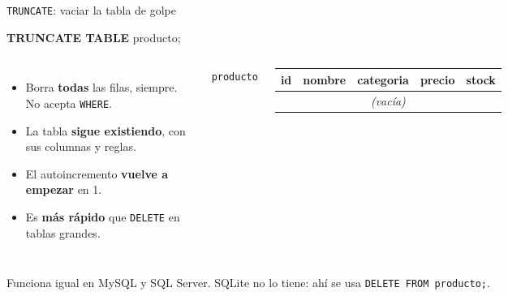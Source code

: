 \documentclass[aspectratio=169,10pt,c]{beamer}
\newcommand{\tbl}[1]{\textcolor{utpNaranja}{\texttt{#1}}}
\newcommand{\kw}[1]{\textcolor{utpRojo}{\textbf{#1}}}
\newenvironment{sqlcode}[1][.86\textwidth]
  {\begin{center}\begin{lrbox}{\sqlbuf}\begin{minipage}{#1}\ttfamily\footnotesize\vspace{6pt}\raggedright}
  {\vspace{6pt}\end{minipage}\end{lrbox}\colorbox{utpGrisClaro}{\usebox{\sqlbuf}}\end{center}}
\newcommand{\cabproducto}{%
  \normalfont\bfseries id & \normalfont\bfseries nombre & \normalfont\bfseries categoria
  & \normalfont\bfseries precio & \normalfont\bfseries stock \\}
\begin{document}
\begin{frame}{\texttt{TRUNCATE}: vaciar la tabla de golpe}
\begin{sqlcode}[.60\textwidth]
\kw{TRUNCATE TABLE} producto;
\end{sqlcode}
\vspace{0.1cm}
\begin{columns}[c,onlytextwidth]
\small
\begin{itemize}\setlength\itemsep{5pt}
  \item Borra \textbf{todas} las filas, siempre. No acepta \texttt{WHERE}.
  \item La tabla \textbf{sigue existiendo}, con sus columnas y reglas.
  \item El autoincremento \textbf{vuelve a empezar} en 1.
  \item Es \textbf{más rápido} que \texttt{DELETE} en tablas grandes.
\end{itemize}
\centering\tbl{producto}\\[4pt]
\scriptsize\ttfamily
\begin{tabular}{lllrr}
\toprule
\cabproducto
\midrule
\multicolumn{5}{c}{\normalfont\color{utpGris}\textit{(vacía)}} \\
\bottomrule
\end{tabular}
\end{columns}
\vspace{0.2cm}
\vspace{0.1cm}
\footnotesize\color{utpGris} Funciona igual en MySQL y SQL Server. SQLite no lo tiene: ahí se usa \texttt{DELETE FROM producto;}.
\end{frame}
\end{document}
